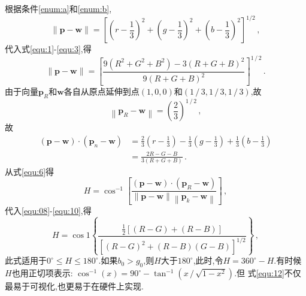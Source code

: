 根据条件\eqref{enum:a}和\eqref{enum:b},
\begin{equation}
  \|\symbf{p}-\symbf{w}\|=\left[\left(r-\frac{1}{3}\right)^{2}+\left(g-\frac{1}{3}\right)^{2}+\left(b-\frac{1}{3}\right)^{2}\right]^{1 / 2}\,,
\end{equation}
代入式\eqref{equ:1}-\eqref{equ:3},得
\begin{equation}\label{equ:08}
  \|\symbf{p}-\symbf{w}\|=\left[\frac{9\left(R^{2}+G^{2}+B^{2}\right)-3(R+G+B)^{2}}{9(R+G+B)^{2}}\right]^{1 \,/ \,2}\,.
  \end{equation}
由于向量$\symbf{p}_R$和$\symbf{w}$各自从原点延伸到点$(1,0,0)$和$(1\,/\,3,1\,/\,3,1\,/\,3)$,故
\begin{equation}
  \left\|\symbf{p}_{R}-\symbf{w}\right\|=\left(\frac{2}{3}\right)^{1 \,/\, 2}\,,
\end{equation}
故
\begin{equation}
  \begin{aligned}\label{equ:10}
  (\symbf{p}-\symbf{w}) \cdot\left(\symbf{p}_{n}-\symbf{w}\right) &=\frac{2}{3}\left(r-\frac{1}{3}\right)-\frac{1}{3}\left(g-\frac{1}{3}\right)+\frac{1}{3}\left(b-\frac{1}{3}\right) \\
  &=\frac{2 R-G-B}{3(R+G+B)}\,.
  \end{aligned}
\end{equation}
从式\eqref{equ:6}得
\begin{equation}
  H=\cos ^{-1}\left[\frac{(\symbf{p}-\symbf{w}) \cdot\left(\symbf{p}_{R}-\symbf{w}\right)}{\|\symbf{p}-\symbf{w}\|\left\|\symbf{p}_{k}-\symbf{w}\right\|}\right]\,,
\end{equation}
代入\eqref{equ:08}-\eqref{equ:10},得
\begin{equation}\label{equ:12}
  H=\cos 1\left\{\frac{\frac{1}{2}[(R-G)+(R-B)]}{\left[(R-G)^{2}+(R-B)(G-B)\right]^{1 / 2}}\right\}\,,
\end{equation}
此式适用于$0^{\circ}\leqslant H \leqslant 180^{\circ}$.如果$b_0>g_0$,则$H$大于$180^{\circ}$,此时,令$H=360^{\circ}-H$.有时候$H$也用正切项表示: $\cos ^{-1}(x)=90^{\circ}-\tan ^{-1}\left(x \,/\, \sqrt{1-x^{2}}\right)$.但
式\eqref{equ:12}不仅最易于可视化,也更易于在硬件上实现.

